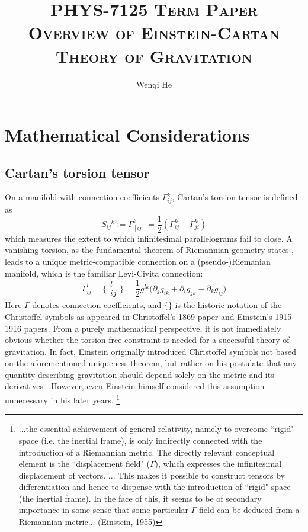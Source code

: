 \documentclass[12pt]{article}
\title{\textsc{\Large{PHYS-7125 Term Paper} \\ \LARGE{Overview of Einstein-Cartan Theory of Gravitation}}}
\author{Wenqi He}
\begin{document}
\sloppy
\maketitle
\section{Mathematical Considerations}
\subsection{Cartan's torsion tensor}
On a manifold with connection coefficients $\Gamma^k_{ij}$, Cartan's torsion tensor is defined as
\[ S_{ij}{}^k := \Gamma^k_{[ij]} = \frac{1}{2}(\Gamma^k_{ij} - \Gamma^k_{ji})\]
which measures the extent to which infinitesimal parallelograms fail to close. A vanishing torsion, as the fundamental theorem of Riemannian geometry states \cite{nlab:fundamental_theorem_of_riemannian_geometry}, leads to a unique metric-compatible connection on a (pseudo-)Riemanian manifold, which is the familiar Levi-Civita connection:
\[ \Gamma^l_{ij} = \{\substack{l\\ij}\} = \frac{1}{2}g^{lk}\Big(\partial_j g_{ik} + \partial_i g_{jk} - \partial_k g_{ij} \Big)\]
Here $\Gamma$ denotes connection coefficients, and $\{\}$ is the historic notation of the Christoffel symbols as appeared in Christoffel's 1869 paper and Einstein's 1915-1916 papers. From a purely mathematical perspective, it is not immediately obvious whether the torsion-free constraint is needed for a successful theory of gravitation. In fact, Einstein originally introduced Christoffel symbols not based on the aforementioned uniqueness theorem, but rather on his postulate that any quantity describing gravitation should depend solely on the metric and its derivatives \cite{einstein1916foundation}. However, even Einstein himself considered this assumption unnecessary in his later years. \footnote{...the essential achievement of general relativity, namely to overcome ``rigid" space (i.e. the inertial frame), is only indirectly connected with the introduction of a Riemannian metric. The directly relevant conceptual element is the ``displacement field" ($\Gamma$), which expresses the infinitesimal displacement of vectors. ... This makes it possible to construct tensors by differentiation and hence to dispense with the introduction of ``rigid" space (the inertial frame). In the face of this, it seems to be of secondary importance in some sense that some particular $\Gamma$ field can be deduced from a Riemannian metric... (Einstein, 1955)}
\end{document}

